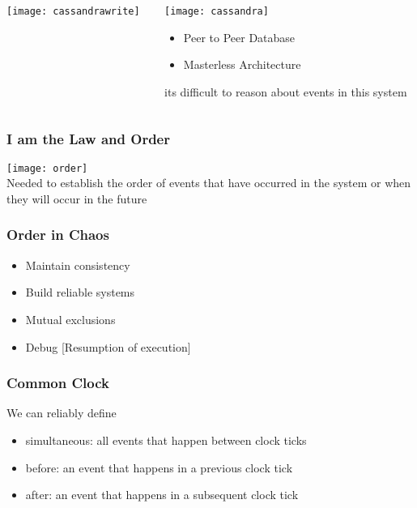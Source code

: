 \documentclass[aspectratio=169, 15pt,usenames,dvipsnames]{beamer}
\begin{document}
	\begin{gdblank}
		\begin{columns}
			\begin{column}{0.6\textwidth}
				\texttt{[image: cassandrawrite]}
			\end{column}
			\begin{column}{0.4\textwidth}
				\texttt{[image: cassandra]}
				\centering
				\begin{itemize}
					\item Peer to Peer Database
					\item Masterless Architecture
				\end{itemize}
				\tiny its difficult to reason about events in this system
			\end{column}
		\end{columns}
	\end{gdblank}   
	\begin{gdblank}
		\frametitle{I am the Law and Order}
		\centering
		\texttt{[image: order]}
		\\Needed to establish the order of events that have occurred in the system or when they will occur in the future
	\end{gdblank}
	\begin{gdblank}
		\frametitle{Order in Chaos}
		\LARGE
		\begin{itemize}
			\item Maintain consistency
			\item Build reliable systems
			\item Mutual exclusions
			\item Debug [Resumption of execution]
		\end{itemize}
	\end{gdblank}
	\begin{gdblank}
		\frametitle{Common Clock}
		\LARGE
		We can reliably define
		\begin{itemize}
			\item simultaneous: all events that happen between clock ticks
			\pause
			\item before: an event that happens in a previous clock tick
			\item after: an event that happens in a subsequent clock tick
		\end{itemize}
	\end{gdblank}
\end{document}
